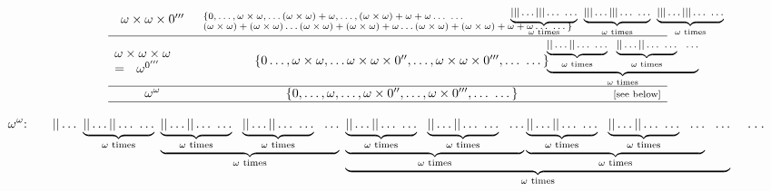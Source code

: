 \documentclass[12pt]{extarticle}
\begin{document}
\begin{landscape}
\[\begin{array}{ccc}
%
\omega\times\omega \times 0'''  & \parbox{110mm}{\vspace{1mm}\scriptsize
$\{0,\dots,\omega\times\omega, \dots (\omega\times\omega)+\omega, \dots, (\omega \times \omega) + \omega + \omega \dots \ \dots \\ (\omega \times \omega) + (\omega \times \omega) \dots (\omega \times \omega) + (\omega \times \omega) + \omega \dots (\omega \times \omega) + (\omega \times \omega) + \omega + \omega \dots \ \dots\}$}
 &  \hspace{-40mm} \parbox{30mm}{\vspace{1mm} \footnotesize $\underbrace{| | |  \dots  | | | \dots \ {\Large \dots}}_{\omega \text{ times}} \ \ \underbrace{| | |  \dots | | | \dots \ {\Large \dots}}_{\omega \text{ times}} \ \ \underbrace{| | |  \dots   | | | \dots \ {\Large \dots}}_{\omega \text{ times}}$}\\\hline
%
\parbox{21mm}{$\omega \times \omega \times \omega \\ \ = \ \ \omega^{0'''}$} &\set{0\dots,\omega\times\omega, \dots \omega\times \omega \times 0'',\dots, \omega\times \omega \times 0''',\dots \ \dots} 
&  \hspace{-20mm} \parbox{30mm}{ \vspace{1mm} \footnotesize $\underbrace{\underbrace{|  | \dots | | \dots \ {\Large \dots}}_{\omega \text{ times}} \ \  \underbrace{| |  \dots  | | \dots \ {\Large \dots}}_{\omega \text{ times}} \ \ \dots}_{\omega \text{ times} }$}\\\hline
%
\omega^\omega &\set{0,\dots,\omega,\dots,\omega \times 0'', \dots,\omega \times 0''', \dots \ \dots} & \text{\scriptsize[see below]}\\ \hline
\end{array}
\]

\vspace{3mm}
{\tiny
$$
\text{\normalsize $\omega^\omega$:}  \quad \quad
| | \dots \
%
\underbrace{| | \dots  | | \dots \ {\Large \dots}}_{\omega \text{ times}} \
%
\underbrace{\underbrace{| |  \dots   | | \dots \ {\Large \dots}}_{\omega \text{ times}} \ \ \underbrace{| |  \dots  | | \dots \ {\Large \dots}}_{\omega \text{ times}} \ \ \dots}_{\omega \text{ times} } \
\underbrace{
\underbrace{\underbrace{| |  \dots  | | \dots \ {\Large \dots}}_{\omega \text{ times}} \ \ \underbrace{| |  \dots  | |  \dots \ {\Large \dots}}_{\omega \text{ times}} \ \ \dots}_{\omega \text{ times} }
%
\underbrace{\underbrace{| |  \dots   | | \dots \ {\Large \dots}}_{\omega \text{ times}} \ \ \underbrace{| |  \dots  | |  \dots \ {\Large \dots}}_{\omega \text{ times}} \ \ \dots}_{\omega \text{ times} }
%
\ \ \dots
}_{\omega \text{ times}}
\text{\large \quad \dots}
$$
}


\end{landscape}
\end{document}
